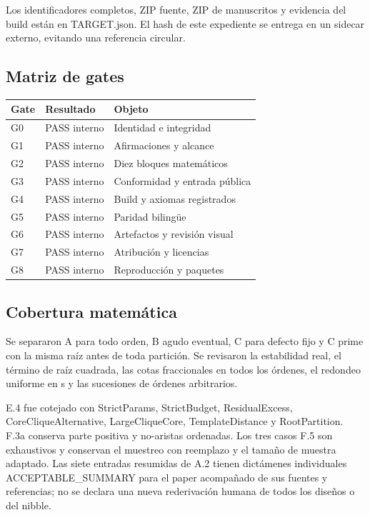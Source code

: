 \documentclass[11pt]{article}
\begin{document}
Los identificadores completos, ZIP fuente, ZIP de manuscritos y
evidencia del build están en TARGET.json. El hash de este expediente se
entrega en un sidecar externo, evitando una referencia circular.

\subsection{Matriz de gates}\label{matriz-de-gates}

{\def\LTcaptype{none} %
\begin{longtable}[]{@{}lll@{}}
\toprule\noalign{}
Gate & Resultado & Objeto \\
\midrule\noalign{}
\endhead
\bottomrule\noalign{}
\endlastfoot
G0 & PASS interno & Identidad e integridad \\
G1 & PASS interno & Afirmaciones y alcance \\
G2 & PASS interno & Diez bloques matemáticos \\
G3 & PASS interno & Conformidad y entrada pública \\
G4 & PASS interno & Build y axiomas registrados \\
G5 & PASS interno & Paridad bilingüe \\
G6 & PASS interno & Artefactos y revisión visual \\
G7 & PASS interno & Atribución y licencias \\
G8 & PASS interno & Reproducción y paquetes \\
\end{longtable}
}

\subsection{Cobertura matemática}\label{cobertura-matemuxe1tica}

Se separaron A para todo orden, B agudo eventual, C para defecto fijo y
C prime con la misma raíz antes de toda partición. Se revisaron la
estabilidad real, el término de raíz cuadrada, las cotas fraccionales en
todos los órdenes, el redondeo uniforme en s y las sucesiones de órdenes
arbitrarios.

E.4 fue cotejado con StrictParams, StrictBudget, ResidualExcess,
CoreCliqueAlternative, LargeCliqueCore, TemplateDistance y
RootPartition. F.3a conserva parte positiva y no-aristas ordenadas. Los
tres casos F.5 son exhaustivos y conservan el muestreo con reemplazo y
el tamaño de muestra adaptado. Las siete entradas resumidas de A.2
tienen dictámenes individuales ACCEPTABLE\_SUMMARY para el paper
acompañado de sus fuentes y referencias; no se declara una nueva
rederivación humana de todos los diseños o del nibble.
\end{document}
